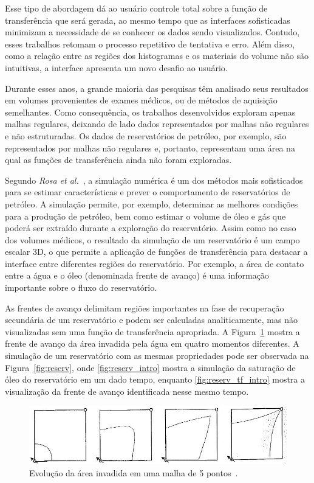     Esse tipo de abordagem dá ao usuário controle total sobre a função de transferência que será gerada, ao mesmo tempo que as interfaces sofisticadas minimizam a necessidade de se conhecer os dados sendo visualizados. Contudo, esses trabalhos retomam o processo repetitivo de tentativa e erro. Além disso, como a relação entre as regiões dos histogramas e os materiais do volume não são intuitivas, a interface apresenta um novo desafio ao usuário.
    
    Durante esses anos, a grande maioria das pesquisas têm analisado seus resultados em volumes provenientes de exames médicos, ou de métodos de aquisição semelhantes. Como consequência, os trabalhos desenvolvidos exploram apenas malhas regulares, deixando de lado dados representados por malhas não regulares e não estruturadas. Os dados de reservatórios de petróleo, por exemplo, são representados por malhas não regulares e, portanto, representam uma área na qual as funções de transferência ainda não foram exploradas.
    
    Segundo \textit{Rosa et al.}~\cite{rosa}, a simulação numérica é um dos métodos mais sofisticados para se estimar características e prever o comportamento de reservatórios de petróleo. A simulação permite, por exemplo, determinar as melhores condições para a produção de petróleo, bem como estimar o volume de óleo e gás que poderá ser extraído durante a exploração do reservatório. Assim como no caso dos volumes médicos, o resultado da simulação de um reservatório é um campo escalar 3D, o que permite a aplicação de funções de transferência para destacar a interface entre diferentes regiões do reservatório. Por exemplo, a área de contato entre a água e o óleo (denominada frente de avanço) é uma informação importante sobre o fluxo do reservatório.
    
    As frentes de avanço delimitam regiões importantes na fase de recuperação secundária de um reservatório e podem ser calculadas analiticamente, mas não visualizadas sem uma função de transferência apropriada. A Figura~\ref{fig:reserv_livro} mostra a frente de avanço da área invadida pela água em quatro momentos diferentes. A simulação de um reservatório com as mesmas propriedades pode ser observada na Figura~\ref{fig:reserv}, onde \ref{fig:reserv_intro} mostra a simulação da saturação de óleo do reservatório em um dado tempo, enquanto \ref{fig:reserv_tf_intro} mostra a visualização da frente de avanço identificada nesse mesmo tempo.
    
\begin{figure}[h]
   	\centering
   	\includegraphics[width=1\textwidth]{images/reserv_livro}
   	\caption{Evolução da área invadida em uma malha de 5 pontos~\cite{rosa}.}
   	\label{fig:reserv_livro}
\end{figure}
    
